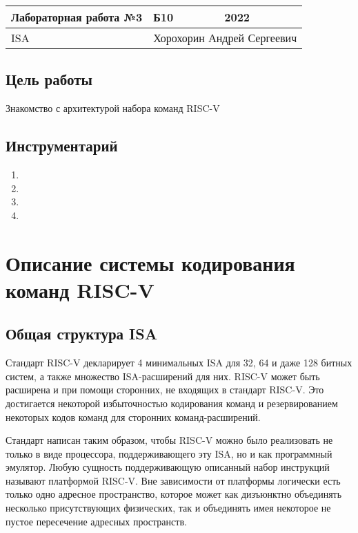\documentclass[14pt, russian, onesize]{extreport}
\begin{document}
\begin{tabular}{|p{8cm}|p{3cm}|p{3cm}|}
    \hline
    Лабораторная работа №3 & Б10 & 2022\\
    \hline
    ISA  & \multicolumn{2}{|c|}{Хорохорин Андрей Сергеевич}\\
    \hline
\end{tabular}
\subsection*{ Цель работы }
Знакомство с архитектурой набора команд RISC-V 
\subsection*{ Инструментарий }
\begin{enumerate}
    \item {}
    \item {}
    \item {}
    \item {}
\end{enumerate}

\section*{Описание системы кодирования команд RISC-V}
\subsection*{Общая структура ISA}
Стандарт RISC-V декларирует 4 минимальных ISA для 32, 64 и даже 128 битных систем,
а также множество ISA-расширений для них.
RISC-V может быть расширена и при помощи сторонних, не входящих в стандарт RISC-V.
Это достигается некоторой избыточностью кодирования команд и резервированием 
некоторых кодов команд для сторонних команд-расширений.

Стандарт написан таким образом, чтобы RISC-V можно было реализовать 
не только в виде процессора, поддерживающего эту ISA, но и как программный 
эмулятор. Любую сущность поддерживающую описанный набор инструкций называют
платформой RISC-V. Вне зависимости от платформы логически есть только
одно адресное пространство, которое может как дизъюнктно объединять несколько 
присутствующих физических, так и объединять имея некоторое не пустое пересечение
адресных пространств.
\end{document}
